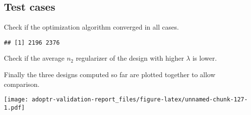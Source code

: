 \documentclass[]{book}
\newenvironment{Shaded}{\begin{snugshade}}{\end{snugshade}}
\newcommand{\ControlFlowTok}[1]{\textcolor[rgb]{0.13,0.29,0.53}{\textbf{#1}}}
\newcommand{\DecValTok}[1]{\textcolor[rgb]{0.00,0.00,0.81}{#1}}
\newcommand{\KeywordTok}[1]{\textcolor[rgb]{0.13,0.29,0.53}{\textbf{#1}}}
\newcommand{\NormalTok}[1]{#1}
\newcommand{\OperatorTok}[1]{\textcolor[rgb]{0.81,0.36,0.00}{\textbf{#1}}}
\newcommand{\StringTok}[1]{\textcolor[rgb]{0.31,0.60,0.02}{#1}}
\begin{document}
\hypertarget{test-cases-13}{%
\subsection{Test cases}\label{test-cases-13}}

Check if the optimization algorithm converged in all cases.

\begin{Shaded}
\end{Shaded}

\begin{verbatim}
## [1] 2196 2376
\end{verbatim}

\begin{Shaded}
\end{Shaded}

Check if the average \(n_2\) regularizer of the design with
higher \(\lambda\) is lower.

\begin{Shaded}
\end{Shaded}

Finally the three designs computed so far are plotted together to allow
comparison.

\texttt{[image: adoptr-validation-report\_files/figure-latex/unnamed-chunk-127-1.pdf]}


\end{document}
